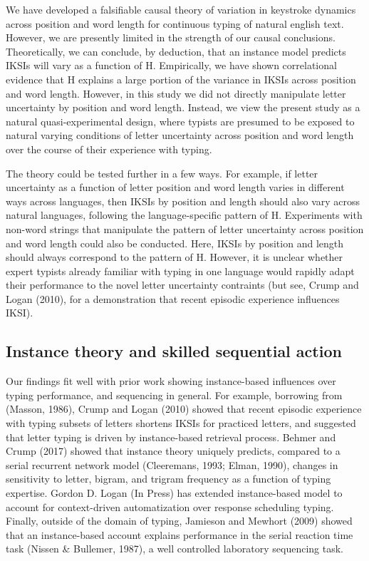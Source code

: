 \documentclass[floatsintext,man]{apa6}
\theoremstyle{definition}
\theoremstyle{definition}
\theoremstyle{definition}
\theoremstyle{remark}
\begin{document}
We have developed a falsifiable causal theory of variation in keystroke
dynamics across position and word length for continuous typing of
natural english text. However, we are presently limited in the strength
of our causal conclusions. Theoretically, we can conclude, by deduction,
that an instance model predicts IKSIs will vary as a function of H.
Empirically, we have shown correlational evidence that H explains a
large portion of the variance in IKSIs across position and word length.
However, in this study we did not directly manipulate letter uncertainty
by position and word length. Instead, we view the present study as a
natural quasi-experimental design, where typists are presumed to be
exposed to natural varying conditions of letter uncertainty across
position and word length over the course of their experience with
typing.

The theory could be tested further in a few ways. For example, if letter
uncertainty as a function of letter position and word length varies in
different ways across languages, then IKSIs by position and length
should also vary across natural languages, following the
language-specific pattern of H. Experiments with non-word strings that
manipulate the pattern of letter uncertainty across position and word
length could also be conducted. Here, IKSIs by position and length
should always correspond to the pattern of H. However, it is unclear
whether expert typists already familiar with typing in one language
would rapidly adapt their performance to the novel letter uncertainty
contraints (but see, Crump and Logan (2010), for a demonstration that
recent episodic experience influences IKSI).

\subsection{Instance theory and skilled sequential
action}\label{instance-theory-and-skilled-sequential-action}

Our findings fit well with prior work showing instance-based influences
over typing performance, and sequencing in general. For example,
borrowing from (Masson, 1986), Crump and Logan (2010) showed that recent
episodic experience with typing subsets of letters shortens IKSIs for
practiced letters, and suggested that letter typing is driven by
instance-based retrieval process. Behmer and Crump (2017) showed that
instance theory uniquely predicts, compared to a serial recurrent
network model (Cleeremans, 1993; Elman, 1990), changes in sensitivity to
letter, bigram, and trigram frequency as a function of typing expertise.
Gordon D. Logan (In Press) has extended instance-based model to account
for context-driven automatization over response scheduling typing.
Finally, outside of the domain of typing, Jamieson and Mewhort (2009)
showed that an instance-based account explains performance in the serial
reaction time task (Nissen \& Bullemer, 1987), a well controlled
laboratory sequencing task.
\end{document}

